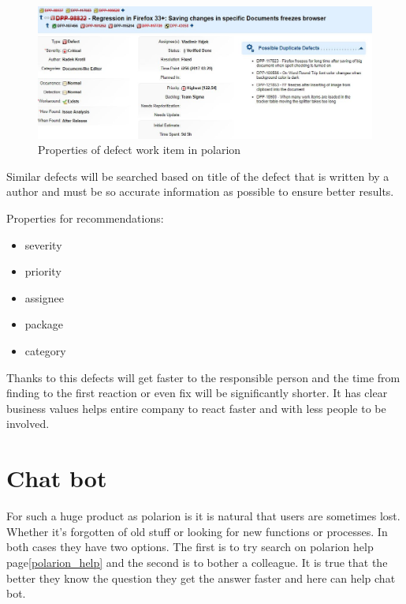 \documentclass[thesis=M,english]{FITthesis}[2012/06/26]
\begin{document}
\begin{figure}[h!]\centering
	\includegraphics[width=1\textwidth]{pictures/defect_menu}
	\caption{Properties of defect work item  in \acrshort{polarion}}\label{fig:defect_menu}
\end{figure}

Similar defects will be searched based on title of the defect that is written by a author and must be so accurate information as possible to ensure better results. \\

\pagebreak

Properties for recommendations:
\begin{itemize}[nosep]
\item severity
\item priority
\item assignee
\item package
\item category\\
\end{itemize}

Thanks to this defects will get faster to the responsible person and the time from finding to the first reaction or even fix will be significantly shorter. It has clear business values helps entire company to react faster and with less people to be involved.

\section{Chat bot}

For such a huge product as \acrshort{polarion} is it is natural that users are sometimes lost. Whether it's forgotten of old stuff or looking for new functions or processes. In both cases they have two options. The first is to try search on \acrshort{polarion} help page\ref{polarion_help} and the second is to bother a colleague. It is true that the better they know the question they get the answer faster and here can help chat bot.\\
\end{document}
